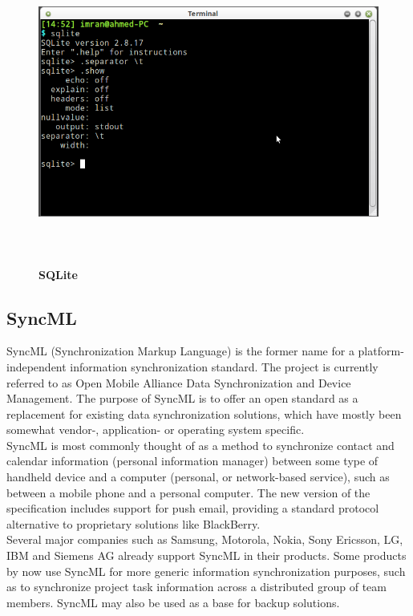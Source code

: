\begin{figure}[H]
  \centering
    \includegraphics[height=10cm, width=13cm]{project/images/sqlite}
  \caption{\textbf{SQLite}}
\end{figure}
\newpage
\subsection{SyncML}
\hspace*{0.82cm}SyncML (Synchronization Markup Language) is the former name for a platform-independent information synchronization 
standard. The project is currently referred to as Open Mobile Alliance Data Synchronization and Device Management. The purpose of 
SyncML is to offer an open standard as a replacement for existing data synchronization solutions, which have mostly been somewhat 
vendor-, application- or operating system specific.\\[0.5cm]
\hspace*{0.82cm}SyncML is most commonly thought of as a method to synchronize contact and calendar information (personal 
information manager) between some type of handheld device and a computer (personal, or network-based service), such as between a 
mobile phone and a personal computer. The new version of the specification includes support for push email, providing a standard 
protocol alternative to proprietary solutions like BlackBerry.\\[0.5cm]
\hspace*{0.82cm}Several major companies such as Samsung, Motorola, Nokia, Sony Ericsson, LG, IBM and Siemens AG already support 
SyncML in their products. Some products by now use SyncML for more generic information synchronization purposes, such as to synchronize 
project task information across a distributed group of team members. SyncML may also be used as a base for backup solutions.